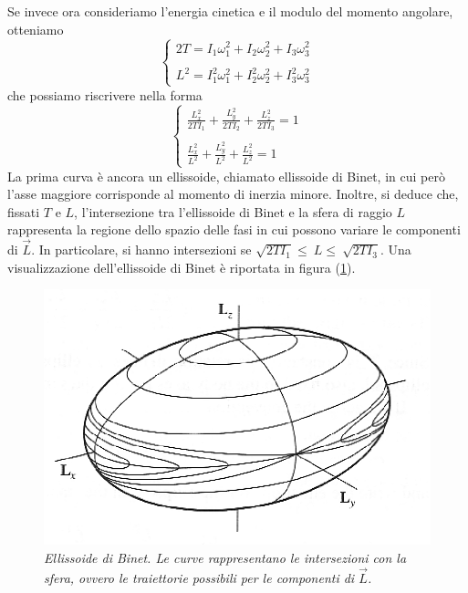 \documentclass[a4paper,11pt]{article}
\begin{document}
\noindent Se invece ora consideriamo l'energia cinetica e il modulo del momento angolare, otteniamo
\[\left\{\begin{array}{l}
2T=I_1\omega_1^2+I_2\omega_2^2+I_3\omega_3^2 \\
\\
L^2=I_1^2\omega_1^2+I_2^2\omega_2^2+I_3^2\omega_3^2
\end{array}\right.\]
che possiamo riscrivere nella forma
\[\left\{\begin{array}{l}
\frac{L^2_x}{2TI_1}+\frac{L^2_y}{2TI_2}+\frac{L^2_z}{2TI_3}=1 \\
\\
\frac{L^2_x}{L^2}+\frac{L^2_y}{L^2}+\frac{L^2_z}{L^2}=1
\end{array}\right.\]
La prima curva è ancora un ellissoide, chiamato ellissoide di Binet, in cui però l'asse maggiore corrisponde al momento di inerzia minore. Inoltre, si deduce che, fissati $T$ e $L$, l'intersezione tra l'ellissoide di Binet e la sfera di raggio $L$ rappresenta la regione dello spazio delle fasi in cui possono variare le componenti di $\vec{L}$. In particolare, si hanno intersezioni se $\sqrt{2TI_1}\leq~L\leq~\sqrt{2TI_3}$. Una visualizzazione dell'ellissoide di Binet è riportata in figura (\ref{ellissoidebinet}).
\begin{figure}
	\centering
	\includegraphics[scale=0.6]{ellissoide_binet.png}
	\caption{\textit{Ellissoide di Binet. Le curve rappresentano le intersezioni con la sfera, ovvero le traiettorie possibili per le componenti di $\vec{L}$.}}
	\label{ellissoidebinet}
\end{figure}
\vspace{5mm}
\end{document}
